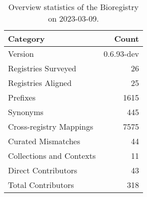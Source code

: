 \begin{table}
\centering
\caption{Overview statistics of the Bioregistry on 2023-03-09.}
\label{tab:bioregistry-summary}
\begin{tabular}{lr}
\toprule
                Category &      Count \\
\midrule
                 Version & 0.6.93-dev \\
     Registries Surveyed &         26 \\
      Registries Aligned &         25 \\
                Prefixes &       1615 \\
                Synonyms &        445 \\
 Cross-registry Mappings &       7575 \\
      Curated Mismatches &         44 \\
Collections and Contexts &         11 \\
     Direct Contributors &         43 \\
      Total Contributors &        318 \\
\bottomrule
\end{tabular}
\end{table}

